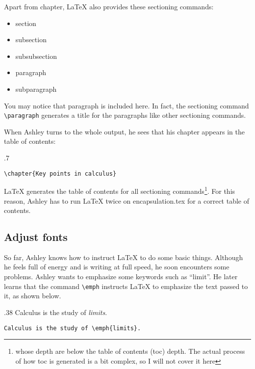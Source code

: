 Apart from chapter, \LaTeX{} also provides these sectioning commands:
\begin{itemize}
\item section
\item subsection
\item subsubsection
\item paragraph
\item subparagraph
\end{itemize}
You may notice that paragraph is included here. In fact, the sectioning command \verb=\paragraph= generates a title for the paragraphs like other sectioning commands.

When Ashley turns to the whole output, he sees that his chapter appears in the table of contents:

\begin{miniexammar}{.7\textandmarginlen}{
\faketoc
{}
}
\begin{lstlisting}
\chapter{Key points in calculus}
\end{lstlisting}
\end{miniexammar}
\LaTeX{} generates the table of contents for all sectioning commands\footnote{whose depth are below the table of contents (toc) depth. The actual process of how toc is generated is a bit complex, so I will not cover it here}. For this reason, Ashley has to run \LaTeX{} twice on encapsulation.tex for a correct table of contents.

\subsection{Adjust fonts}
So far, Ashley knows how to instruct \LaTeX{} to do some basic things. Although he feels full of energy and is writing at full speed, he soon encounters some problems. Ashley wants to emphasize some keywords such as ``limit''. He later learns that the command \verb=\emph= instructs \LaTeX{} to emphasize the text passed to it, as shown below.

\begin{parexammar}{.38\textandmarginlen}{
Calculus is the study of \emph{limits}.
}
\begin{lstlisting}
Calculus is the study of \emph{limits}.
\end{lstlisting}
\end{parexammar}

